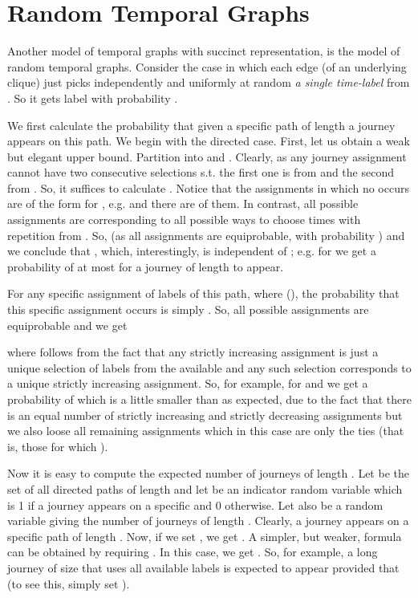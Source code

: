 \documentclass[oribibl, 11pt]{llncs}
\begin{document}
\section{Random Temporal Graphs}
\label{sec:random}

Another model of temporal graphs with succinct representation, is the model of random temporal graphs. Consider the case in which each edge (of an underlying clique) just picks independently and uniformly at random \emph{a single time-label} from . So it gets label  with probability .

We first calculate the probability that given a specific path  of length  a journey appears on this path. We begin with the directed case. First, let us obtain a weak but elegant upper bound. Partition  into  and . Clearly,  as any journey assignment cannot have two consecutive selections s.t. the first one is from  and the second from . So, it suffices to calculate . Notice that the assignments in which no  occurs are of the form  for , e.g.  and there are  of them. In contrast, all possible assignments are  corresponding to all possible ways to choose  times with repetition from . So,  (as all assignments are equiprobable, with probability ) and we conclude that , which, interestingly, is independent of ; e.g. for  we get a probability of at most  for a journey of length  to appear.

For any specific assignment of labels  of this path, where  (), the probability that this specific assignment occurs is simply . So, all possible assignments are equiprobable and we get
  
where  follows from the fact that any strictly increasing assignment is just a unique selection of  labels from the  available and any such selection corresponds to a unique strictly increasing assignment. So, for example, for  and  we get a probability of  which is a little smaller than  as expected, due to the fact that there is an equal number of strictly increasing and strictly decreasing assignments but we also loose all remaining assignments which in this case are only the ties (that is, those for which ).

Now it is easy to compute the expected number of journeys of length . Let  be the set of all directed paths of length  and let  be an indicator random variable which is 1 if a journey appears on a specific  and 0 otherwise. Let also  be a random variable giving the number of journeys of length . Clearly, a journey appears on a specific path of length . Now, if we set , we get . A simpler, but weaker, formula can be obtained by requiring . In this case, we get . So, for example, a long journey of size  that uses all available labels is expected to appear provided that  (to see this, simply set ).
\end{document}
